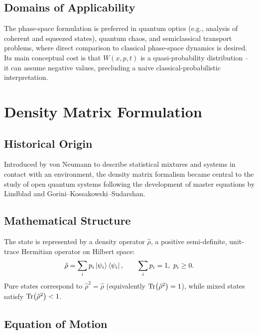 \documentclass[11pt,a4paper]{article}
\begin{document}
\subsection{Domains of Applicability}

The phase-space formulation is preferred in quantum optics (e.g., analysis of coherent and squeezed states), quantum chaos, and semiclassical transport problems, where direct comparison to classical phase-space dynamics is desired. Its main conceptual cost is that $W(x,p,t)$ is a quasi-probability distribution -- it can assume negative values, precluding a naive classical-probabilistic interpretation.

\section{Density Matrix Formulation}

\subsection{Historical Origin}

Introduced by von Neumann \citep{vonneumann1932} to describe statistical mixtures and systems in contact with an environment, the density matrix formalism became central to the study of open quantum systems following the development of master equations by Lindblad \citep{lindblad1976} and Gorini--Kossakowski--Sudarshan.

\subsection{Mathematical Structure}

The state is represented by a density operator $\hat{\rho}$, a positive semi-definite, unit-trace Hermitian operator on Hilbert space:
\begin{equation}
    \hat{\rho} = \sum_i p_i \ket{\psi_i}\bra{\psi_i}, \qquad \sum_i p_i = 1,\ p_i \geq 0.
\end{equation}
Pure states correspond to $\hat{\rho}^2 = \hat{\rho}$ (equivalently $\Tr(\hat{\rho}^2)=1$), while mixed states satisfy $\Tr(\hat{\rho}^2) < 1$.

\subsection{Equation of Motion}
\end{document}
